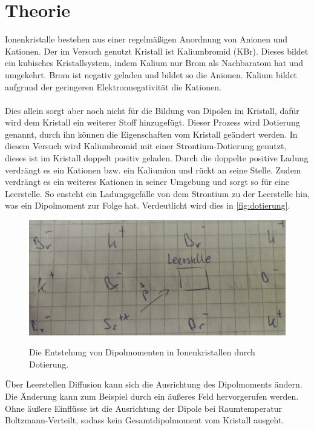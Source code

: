 \section{Theorie}
\label{sec:Theorie}
Ionenkristalle bestehen aus einer regelmäßigen Anordnung von Anionen und Kationen.
Der im Versuch genutzt Kristall ist Kaliumbromid (KBr).
Dieses bildet ein kubisches Kristallsystem, indem Kalium nur Brom als Nachbaratom hat und umgekehrt.
Brom ist negativ geladen und bildet so die Anionen.
Kalium bildet aufgrund der geringeren Elektronnegativität die Kationen.
\\\\
Dies allein sorgt aber noch nicht für die Bildung von Dipolen im Kristall, dafür wird dem Kristall ein weiterer Stoff hinzugefügt.
Dieser Prozess wird Dotierung genannt, durch ihn können die Eigenschaften vom Kristall geändert werden.
In diesem Versuch wird Kaliumbromid mit einer Strontium-Dotierung genutzt, dieses ist im Kristall doppelt positiv geladen.
Durch die doppelte positive Ladung verdrängt es ein Kationen bzw. ein Kaliumion und rückt an seine Stelle.
Zudem verdrängt es ein weiteres Kationen in seiner Umgebung und sorgt so für eine Leerstelle.
So ensteht ein Ladungsgefälle von dem Strontium zu der Leerstelle hin, was ein Dipolmoment zur Folge hat.
Verdeutlicht wird dies in \autoref{fig:dotierung}.
\begin{figure}
    \centering
    \caption{Die Entstehung von Dipolmomenten in Ionenkristallen durch Dotierung.}
    \includegraphics[width=\textwidth]{content/data/dotierung.jpeg}
    \label{fig:dotierung}
\end{figure}
Über Leerstellen Diffusion kann sich die Ausrichtung des Dipolmoments ändern.
Die Änderung kann zum Beispiel durch ein äußeres Feld hervorgerufen werden.
Ohne äußere Einflüsse ist die Ausrichtung der Dipole bei Raumtemperatur Boltzmann-Verteilt, sodass kein Gesamtdipolmoment vom Kristall ausgeht.
\\\\
